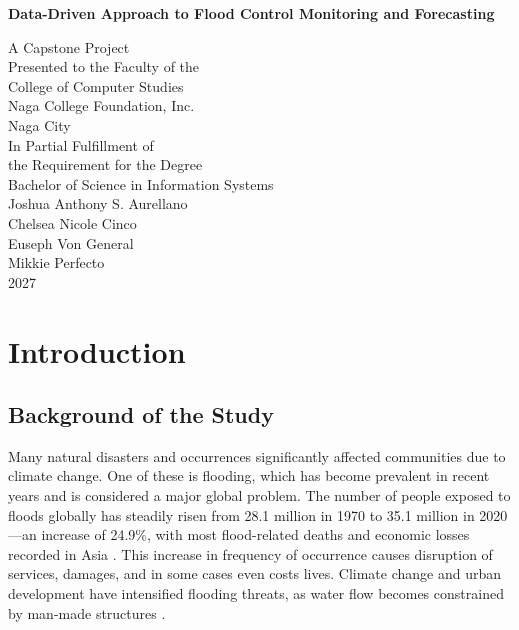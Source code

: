 \documentclass{research}
\title{}
\author{Joshua Anthony S. Aurellano, Chelsea Nicole Cinco, Euseph Von General, Mikkie Perfecto}
\begin{document}
\thispagestyle{empty}
\begin{center}
  \vspace*{1in}
  {\Huge\bfseries Data-Driven Approach to Flood Control Monitoring and Forecasting \par}
  \vspace{1in}
  A Capstone Project\\
  Presented to the Faculty of the\\
  College of Computer Studies\\
  Naga College Foundation, Inc.\\
  Naga City\\
  \vspace{1in}
  In Partial Fulfillment of\\
  the Requirement for the Degree\\
  Bachelor of Science in Information Systems\\
  \vspace{0.5in}
  Joshua Anthony S. Aurellano \\
  Chelsea Nicole Cinco \\
  Euseph Von General \\
  Mikkie Perfecto \\
  \vspace*{0.5in}
  2027
\end{center}
\clearpage

\tableofcontents
\clearpage
\listoffigures
\clearpage
\listoftables
\clearpage

\chapter{Introduction}

\section{Background of the Study}

Many natural disasters and occurrences significantly affected communities due to climate change. One of these is flooding, which has become prevalent in recent years and is considered a major global problem. The number of people exposed to floods globally has steadily risen from 28.1 million in 1970 to 35.1 million in 2020---an increase of 24.9\%, with most flood-related deaths and economic losses recorded in Asia \cite{undrr2025floods}. This increase in frequency of occurrence causes disruption of services, damages, and in some cases even costs lives. Climate change and urban development have intensified flooding threats, as water flow becomes constrained by man-made structures \cite{koutsovili2023early}.
\end{document}
